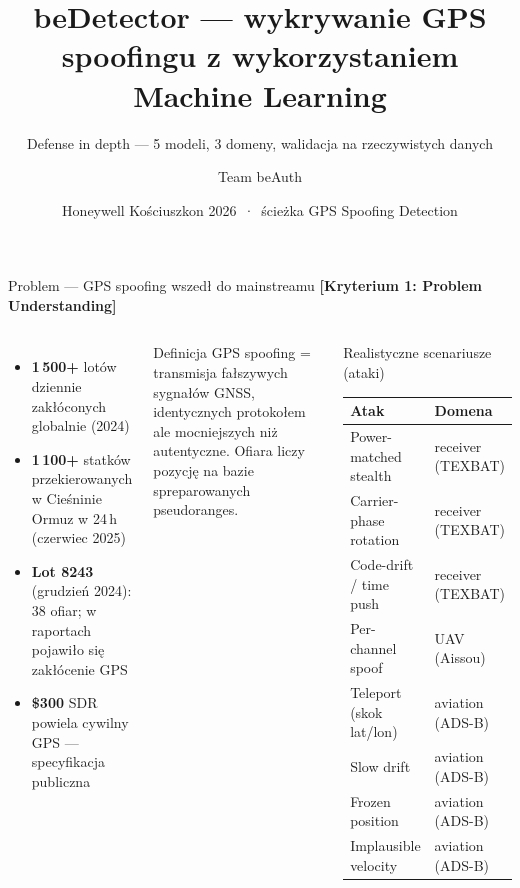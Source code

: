 \documentclass[10pt,aspectratio=169]{beamer}
\title{beDetector — wykrywanie GPS spoofingu z wykorzystaniem Machine Learning}
\subtitle{Defense in depth — 5 modeli, 3 domeny, walidacja na rzeczywistych danych}
\author{Team beAuth}
\date{Honeywell Kościuszkon 2026 \,·\, ścieżka GPS Spoofing Detection}
\institute{}
\newcommand{\stat}[2]{{\color{accent}\bfseries #1} #2}
\newcommand{\criterion}[1]{{\tiny\color{primaryLight}\textbf{[Kryterium #1]}}}
\begin{document}
\maketitle

\begin{frame}{Problem — GPS spoofing wszedł do mainstreamu}
    \criterion{1: Problem Understanding}
    \vspace{0.2cm}
    \begin{columns}[T,onlytextwidth]
        \begin{itemize}\setlength\itemsep{0.3em}
            \item \stat{1\,500+}{lotów dziennie zakłóconych globalnie (2024)}
            \item \stat{1\,100+}{statków przekierowanych w Cieśninie Ormuz w 24\,h (czerwiec 2025)}
            \item \stat{Lot 8243}{(grudzień 2024): 38 ofiar; w raportach pojawiło się zakłócenie GPS}
            \item \stat{\$300}{SDR powiela cywilny GPS — specyfikacja publiczna}
        \end{itemize}

        \vspace{0.5em}
        \begin{block}{Definicja}
            \footnotesize GPS spoofing = transmisja fałszywych sygnałów GNSS, identycznych protokołem ale mocniejszych niż autentyczne. Ofiara liczy pozycję na bazie spreparowanych pseudoranges.
        \end{block}
        \begin{block}{Realistyczne scenariusze (ataki)}
            \footnotesize
            \begin{tabular}{@{}ll@{}}
                \toprule
                Atak & Domena \\
                \midrule
                Power-matched stealth & receiver (TEXBAT) \\
                Carrier-phase rotation & receiver (TEXBAT) \\
                Code-drift / time push & receiver (TEXBAT) \\
                Per-channel spoof & UAV (Aissou) \\
                Teleport (skok lat/lon) & aviation (ADS-B) \\
                Slow drift & aviation (ADS-B) \\
                Frozen position & aviation (ADS-B) \\
                Implausible velocity & aviation (ADS-B) \\
                \bottomrule
            \end{tabular}
        \end{block}


\end{columns}
\end{frame}
\end{document}
